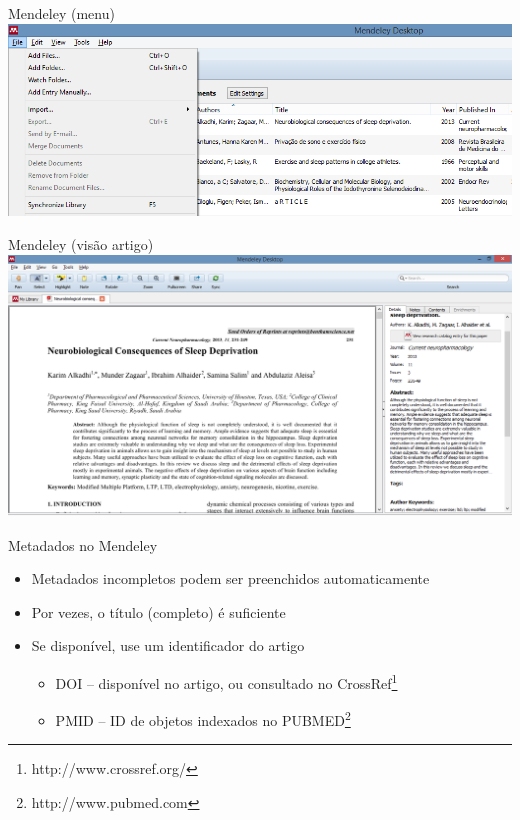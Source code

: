 \documentclass{beamer}
\begin{document}
\begin{frame}{Mendeley (menu)}
  \centering
  \includegraphics[width=1.2\textwidth]{Referencias/mendeley-menu}
\end{frame}

\begin{frame}{Mendeley (visão artigo)}
  \centering
  \includegraphics[width=1.2\textwidth]{Referencias/mendeley-artigo}
\end{frame}

\begin{frame}{Metadados no Mendeley}
  \begin{itemize}
    \footnotesize
  \item Metadados incompletos podem ser preenchidos automaticamente
    \bigskip
  \item Por vezes, o título (completo) é suficiente
    \bigskip
  \item Se disponível, use um identificador do artigo %
    \begin{itemize}
      \scriptsize
    \item DOI -- disponível no artigo, ou consultado no CrossRef\footnote{http://www.crossref.org/}
    \item PMID -- ID de objetos indexados no PUBMED\footnote{http://www.pubmed.com}
    \end{itemize}
  \end{itemize}
\end{frame}
\end{document}
